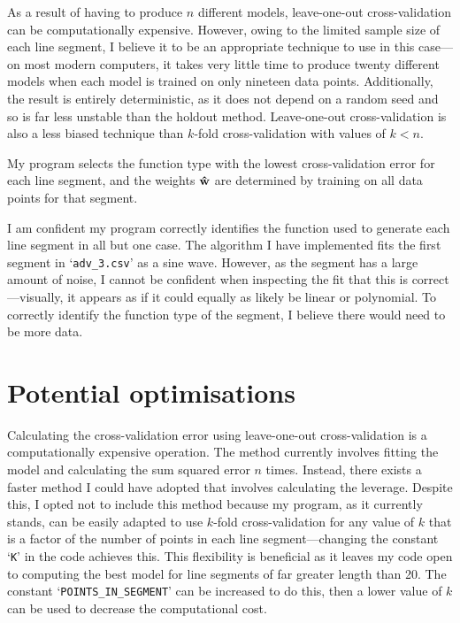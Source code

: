 \documentclass[onecolumn, 12pt, a4paper]{article}
\begin{document}
As a result of having to produce $n$ different models,
leave-one-out cross-validation can be computationally expensive.
However, owing to the limited sample size of each line segment,
I believe it to be an appropriate technique to use in this case---on
most modern computers, it takes very little time
to produce twenty different models when each model is trained
on only nineteen data points.
Additionally, the result is entirely deterministic, as it does not depend
on a random seed and so is far less unstable than the holdout method.
Leave-one-out cross-validation is also a less biased technique
than $k$-fold cross-validation with values of $k < n$.

My program selects the function type with the lowest
cross-validation error for each line segment,
and the weights $\vb{\hat{w}}$ are determined by training on all
data points for that segment.

I am confident my program correctly identifies the function used
to generate each line segment in all but one case.
The algorithm I have implemented fits the first segment
in `\texttt{adv\_3.csv}' as a sine wave.
However, as the segment has a large amount of noise, I cannot be
confident when inspecting the fit that this is correct---visually, it appears as if it could equally as likely
be linear or polynomial.
To correctly identify the function type of the segment, I believe there would need to be more data.

\section{Potential optimisations}


Calculating the cross-validation error using leave-one-out
cross-validation is a computationally expensive operation.
The method currently involves
fitting the model and calculating the sum squared error
$n$ times. 
Instead, there exists a faster method I could have
adopted that involves calculating the leverage.
Despite this, I opted not to include this method 
because my program, as it currently stands, can be 
easily adapted to use $k$-fold cross-validation for 
any value of $k$ that is a factor of the number of points in each line segment---changing
the constant `\texttt{K}' in the code achieves this.
This flexibility is beneficial as it leaves my code open to
computing the best model for line segments of far greater length than 20.
The constant `\texttt{POINTS\_IN\_SEGMENT}' can be increased to do this,
then a lower value of $k$ can be used to decrease the computational cost.
\end{document}
